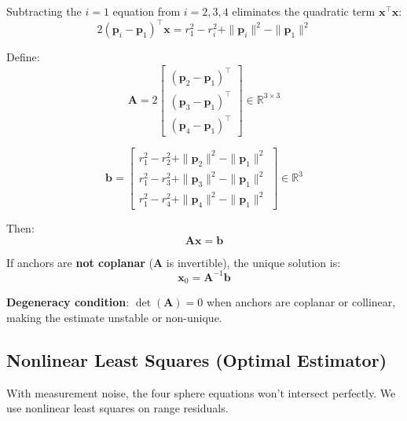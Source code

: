 \documentclass[11pt,a4paper]{article}
\begin{document}
Subtracting the $i=1$ equation from $i = 2, 3, 4$ eliminates the quadratic term $\mathbf{x}^\top \mathbf{x}$:
\begin{equation}
    2(\mathbf{p}_i - \mathbf{p}_1)^\top \mathbf{x} = r_1^2 - r_i^2 + \|\mathbf{p}_i\|^2 - \|\mathbf{p}_1\|^2
\end{equation}

\begin{mathbox}
Define:
\begin{equation}
    \mathbf{A} = 2 \begin{bmatrix} 
        (\mathbf{p}_2 - \mathbf{p}_1)^\top \\
        (\mathbf{p}_3 - \mathbf{p}_1)^\top \\
        (\mathbf{p}_4 - \mathbf{p}_1)^\top 
    \end{bmatrix} \in \mathbb{R}^{3 \times 3}
\end{equation}

\begin{equation}
    \mathbf{b} = \begin{bmatrix}
        r_1^2 - r_2^2 + \|\mathbf{p}_2\|^2 - \|\mathbf{p}_1\|^2 \\
        r_1^2 - r_3^2 + \|\mathbf{p}_3\|^2 - \|\mathbf{p}_1\|^2 \\
        r_1^2 - r_4^2 + \|\mathbf{p}_4\|^2 - \|\mathbf{p}_1\|^2
    \end{bmatrix} \in \mathbb{R}^3
\end{equation}

Then:
\begin{equation}
    \mathbf{A}\mathbf{x} = \mathbf{b}
\end{equation}

If anchors are \textbf{not coplanar} ($\mathbf{A}$ is invertible), the unique solution is:
\begin{equation}
    \boxed{\mathbf{x}_0 = \mathbf{A}^{-1} \mathbf{b}}
\end{equation}
\end{mathbox}

\textbf{Degeneracy condition}: $\det(\mathbf{A}) = 0$ when anchors are coplanar or collinear, making the estimate unstable or non-unique.

\subsection{Nonlinear Least Squares (Optimal Estimator)}

With measurement noise, the four sphere equations won't intersect perfectly. We use nonlinear least squares on range residuals.
\end{document}
